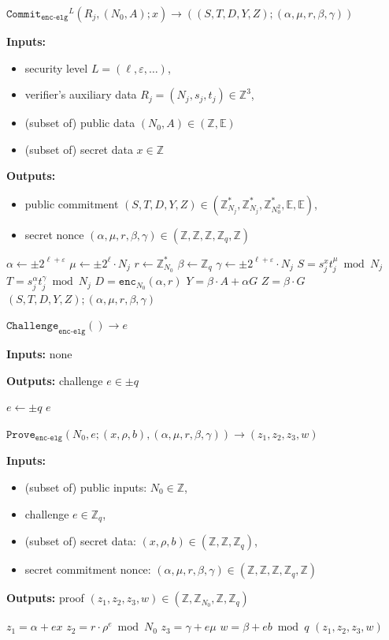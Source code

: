 \documentclass[11pt]{article}
\newenvironment{inlineAlgorithm}{}{}
\newcommand{\algoName}[1]{#1 \par}
\newcommand{\algoInputs}[1]{
    {\small \bf Inputs:} #1 \par
}
\newcommand{\algoInputsList}[1]{
    {\small \bf Inputs:} 
        \begin{itemize}[noitemsep,topsep=0pt]
            #1
        \end{itemize}
}
\newcommand{\algoOutputs}[1]{
    {\small \bf Outputs:} #1 \par
}
\newcommand{\algoOutputsList}[1]{
    {\small \bf Outputs:}
        \begin{itemize}[noitemsep,topsep=0pt]
            #1
        \end{itemize}
}
\newcommand{\enc}{\ensuremath{\mathtt{enc}}}
\newcommand{\commit}[1]{\ensuremath{\mathtt{Commit}_{\mathtt{#1}}}}
\newcommand{\challenge}[1]{\ensuremath{\mathtt{Challenge}_{\mathtt{#1}}}}
\newcommand{\prove}[1]{\ensuremath{\mathtt{Prove}_{\mathtt{#1}}}}
\newcommand{\E}{\mathbb{E}}
\newcommand{\Z}{\mathbb{Z}}
\newcommand{\?}[1]{\stackrel{?}{#1}}
\begin{document}
\begin{description}

\item
\begin{inlineAlgorithm}
\algoName{$\commit{enc\mbox{-}elg}^L(R_j, (N_0, A); x) \to ((S, T, D, Y, Z); (\alpha, \mu, r, \beta, \gamma))$}
\algoInputsList{
    \item security level $L = (\ell, \varepsilon, \dots)$,
    \item verifier's auxiliary data $R_j = (N_j, s_j, t_j) \in \Z^3$,
    \item (subset of) public data $(N_0, A) \in (\Z, \E)$
    \item (subset of) secret data $x \in \Z$
}
\algoOutputsList{
    \item public commitment $(S, T, D, Y, Z) \in (\Z^*_{N_j}, \Z^*_{N_j}, \Z^*_{N^2_0}, \E, \E)$,
    \item secret nonce $(\alpha, \mu, r, \beta, \gamma) \in (\Z, \Z, \Z, \Z_q, \Z)$
}
\begin{algorithmic}[1]
\State $\alpha \gets \pm 2^{\ell + \varepsilon}$
\State $\mu \gets \pm 2^\ell \cdot N_j$
\State $r \gets \Z^*_{N_0}$
\State $\beta \gets \Z_q$
\State $\gamma \gets \pm 2^{\ell + \varepsilon} \cdot N_j$
\Statex
\State $S = s_j^x t_j^\mu \bmod N_j$
\State $T = s_j^\alpha t_j^\gamma \bmod N_j$
\State $D = \enc_{N_0}(\alpha, r)$
\State $Y = \beta \cdot A + \alpha G$
\State $Z = \beta \cdot G$
\Statex
\State \Return $(S, T, D, Y, Z); (\alpha, \mu, r, \beta, \gamma)$
\end{algorithmic}
\end{inlineAlgorithm}

\item
\begin{inlineAlgorithm}
\algoName{$\challenge{enc\mbox{-}elg}() \to e$}
\algoInputs{none}
\algoOutputs{challenge $e \in \pm q$}
\begin{algorithmic}[1]
\State $e \gets \pm q$
\State \Return $e$
\end{algorithmic}
\end{inlineAlgorithm}

\item
\begin{inlineAlgorithm}
\algoName{$\prove{enc\mbox{-}elg}(N_0, e; (x, \rho, b), (\alpha, \mu, r, \beta, \gamma))
    \to (z_1, z_2, z_3, w)$}
\algoInputsList{
    \item (subset of) public inputs: $N_0 \in \Z$,
    \item challenge $e \in \Z_q$,
    \item (subset of) secret data: $(x, \rho, b) \in (\Z, \Z, \Z_q)$,
    \item secret commitment nonce: $(\alpha, \mu, r, \beta, \gamma) \in (\Z, \Z, \Z, \Z_q, \Z)$
}
\algoOutputs{proof $(z_1, z_2, z_3, w) \in (\Z, \Z_{N_0}, \Z, \Z_q)$}
\begin{algorithmic}[1]
\State $z_1 = \alpha + e x$
\State $z_2 = r \cdot \rho^e \bmod N_0$
\State $z_3 = \gamma + e \mu$
\State $w = \beta + e b \bmod q$
\State \Return $(z_1, z_2, z_3, w)$
\end{algorithmic}
\end{inlineAlgorithm}


\end{description}
\end{document}
